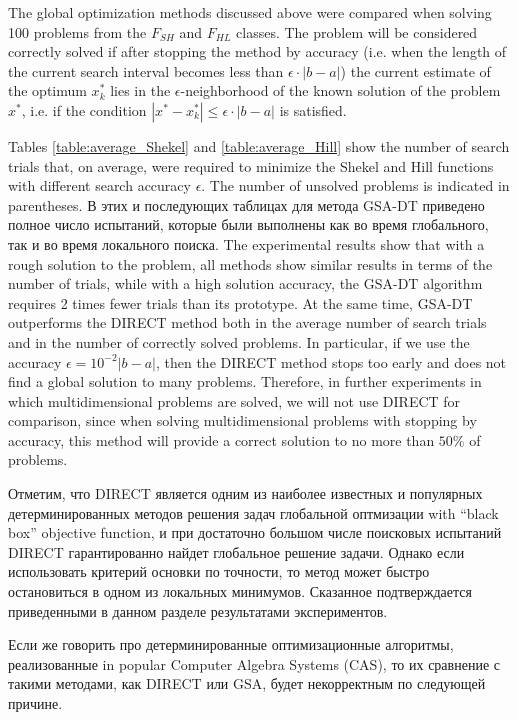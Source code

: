 \documentclass[entropy,article,submit,moreauthors,pdftex]{Definitions/mdpi}
\begin{document}
The global optimization methods discussed above were compared when solving 100 problems from the  $F_{SH}$ and $F_{HL}$ classes. The problem will be considered correctly solved if after stopping the method by accuracy (i.e. when the length of the current search interval becomes less than $\epsilon \cdot \left|b-a\right| $) the current estimate of the optimum  $x_k^*$ lies in the $\epsilon$-neighborhood of the known solution of the problem  $x^*$, i.e. if the condition  $|x^*-x_k^*| \leq \epsilon \cdot \left|b-a\right|$ is satisfied.

Tables \ref{table:average_Shekel} and \ref{table:average_Hill} show the number of search trials that, on average, were required to minimize the Shekel and Hill functions with different search accuracy  $\epsilon$. The number of unsolved problems is indicated in parentheses. 
В этих и последующих таблицах для метода GSA-DT приведено полное число испытаний, которые были выполнены как во время глобального, так и во время локального поиска.
The experimental results show that with a rough solution to the problem, all methods show similar results in terms of the number of trials, while with a high solution accuracy, the GSA-DT algorithm requires 2 times fewer trials than its prototype. At the same time, GSA-DT outperforms the DIRECT method both in the average number of search trials and in the number of correctly solved problems. In particular, if we use the accuracy $\epsilon = 10^{-2}\left|b-a\right|$, then the DIRECT method stops too early and does not find a global solution to many problems. 
Therefore, in further experiments in which multidimensional problems are solved, we will not use DIRECT for comparison, since when solving multidimensional problems with stopping by accuracy, this method will provide a correct solution to no more than  $50\%$ of problems.

Отметим, что DIRECT является одним из наиболее известных и популярных детерминированных методов решения задач глобальной оптмизации with ``black box'' objective function, и при достаточно большом числе поисковых испытаний DIRECT гарантированно найдет глобальное решение задачи.  
Однако если использовать критерий основки по точности, то метод может быстро остановиться в одном из локальных минимумов. Сказанное подтверждается приведенными в данном разделе результатами экспериментов. 

Если же говорить про детерминированные оптимизационные алгоритмы, реализованные in popular Computer Algebra Systems (CAS), то их сравнение с такими методами, как DIRECT или GSA, будет некорректным по следующей причине.
\end{document}
